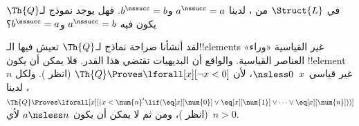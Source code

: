 \documentclass[../../../include/open-logic-section]{subfiles}
\begin{document}
\begin{prob}
في $\Struct{L}$ من ، لدينا
$a^\nssucc=a$ و$b^\nssucc=b$. فهل يوجد نموذج لـ$\Th{Q}$ يكون فيه
$a^\nssucc=b$ و$b^\nssucc=a$؟
\end{prob}

\begin{explain}
لقد أنشأنا صراحة نماذج لـ$\Th{Q}$ تعيش فيها الـ!!{element}s غير
القياسية «وراء» العناصر القياسية. والواقع أن البديهيات تقتضي هذا القدر.
فلا يمكن أن يكون !!{element} غير قياسي~$x$~${} \nsless 0$، لأن
$\Th{Q} \Proves \lforall[x][\lnot x<0]$ (انظر
). ولكل $n$، لدينا
$\Th{Q} \Proves \lforall[x][(x < \num{n}' \lif
(\eq[x][\num{0}] \lor \eq[x][\num{1}] \lor \dots \lor
\eq[x][\num{n}]))]$ (انظر )،
ومن ثم لا يمكن أن يكون $a \nsless n$ لأي~$n>0$.
\end{explain}
\end{document}

